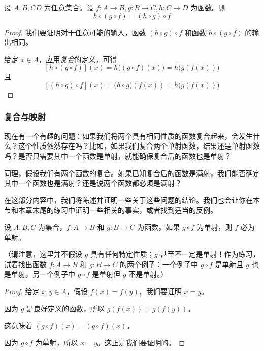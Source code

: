 \begin{theorem}
    设 $A,B,C D$ 为任意集合。设 $f : A \to B, g : B \to C, h : C \to D$ 为函数。则
    \[h \circ (g \circ f) = (h \circ g) \circ f\]
\end{theorem}

\begin{proof}
    我们要证明对于任意可能的输入，函数 $(h \circ g) \circ f$ 和函数 $h \circ (g \circ f)$ 的输出相同。

    给定 $x \in A$，应用\emph{复合}的定义，可得
    \[[h \circ (g \circ f)](x) = h\big((g \circ f)(x)\big) = h\big(g(f(x))\big)\]
    且
    \[[(h \circ g) \circ f](x) = \big(h \circ g\big)(f(x)) = h\big(g(f(x))\big)\]
\end{proof}

\subsubsection*{复合与映射}

现在有一个有趣的问题：如果我们将两个具有相同性质的函数复合起来，会发生什么？这个性质依然存在吗？比如，如果我们复合两个单射函数，结果还是单射函数吗？是否只需要其中一个函数是单射，就能确保复合后的函数也是单射？

同理，假设我们有两个函数的复合。如果已知复合后的函数是满射，我们能否确定其中一个函数也是满射？还是说两个函数都必须是满射？

在这部分内容中，我们将陈述并证明一些关于这些问题的结论。我们也会让你在本节和本章末尾的练习中证明一些相关的事实，或者找到适当的反例。

\begin{proposition}
    设 $A, B, C$ 为集合，$f : A \to B$ 和 $g : B \to C$ 为函数。如果 $g \circ f$ 为单射，则 $f$ 必为单射。
\end{proposition}

（请注意，这里并不假设 $g$ 具有任何特定性质；$g$ 甚至不一定是单射！作为练习，试着找出函数 $f: A \to B$ 和 $g: B \to C$ 的两个例子：一个例子中 $g \circ f$ 是单射且 $g$ 也是单射，另一个例子中 $g \circ f$ 是单射但 $g$ 不是单射。）

\begin{proof}
    给定 $x,y \in A$，假设 $f(x)=f(y)$，我们要证明 $x=y$。

    因为 $g$ 是良好定义的函数，所以 $g(f(x)) = g(f(y))$。

    这意味着 $(g \circ f)(x) = (g \circ f)(x)$。

    因为 $g \circ f$ 为单射，所以 $x=y$。这正是我们要证明的。
\end{proof}

